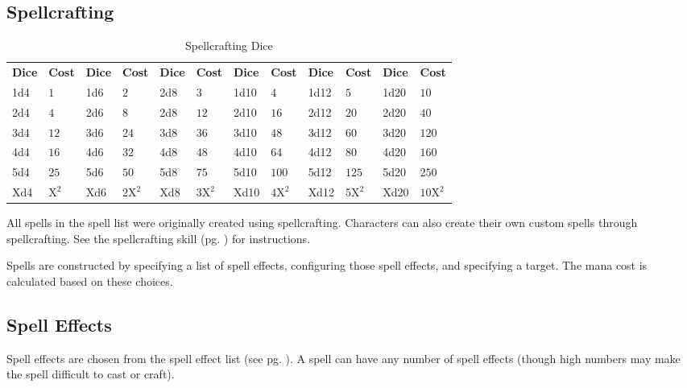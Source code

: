
\begin{multicols*}{2}
    \section{Spellcrafting}
    \begin{table*}[ht]
        \unclassedrowcolors
        \begin{tabularx}{\textwidth}{X X X X X X X X X X X X}
            \textbf{Dice} & \textbf{Cost} & \textbf{Dice} & \textbf{Cost} & \textbf{Dice} & \textbf{Cost} & \textbf{Dice} & \textbf{Cost} & \textbf{Dice} & \textbf{Cost} & \textbf{Dice} & \textbf{Cost} \\
            1d4 & $1$   & 1d6 & $2$    & 2d8 & $3$    & 1d10 & $4$    & 1d12 & $5$    & 1d20 & $10$    \\
            2d4 & $4$   & 2d6 & $8$    & 2d8 & $12$   & 2d10 & $16$   & 2d12 & $20$   & 2d20 & $40$    \\
            3d4 & $12$  & 3d6 & $24$   & 3d8 & $36$   & 3d10 & $48$   & 3d12 & $60$   & 3d20 & $120$   \\
            4d4 & $16$  & 4d6 & $32$   & 4d8 & $48$   & 4d10 & $64$   & 4d12 & $80$   & 4d20 & $160$   \\
            5d4 & $25$  & 5d6 & $50$   & 5d8 & $75$   & 5d10 & $100$  & 5d12 & $125$  & 5d20 & $250$   \\
            Xd4 & $\text{X}^2$ & Xd6 & $\text{2X}^2$ & Xd8 & $\text{3X}^2$ & Xd10 & $\text{4X}^2$ & Xd12 & $\text{5X}^2$ & Xd20 & $\text{10X}^2$ \\
        \end{tabularx}
        \caption{Spellcrafting Dice}
        \label{tab:spellcrafting-dice}
    \end{table*}

    All spells in the spell list were originally created using spellcrafting.
    Characters can also create their own custom spells through spellcrafting.
    See the spellcrafting skill (pg. \pageref{skill:spellcrafting}) for
    instructions.

    Spells are constructed by specifying a list of spell effects, configuring
    those spell effects, and specifying a target. The mana cost is calculated
    based on these choices.

    \subsection{Spell Effects}
    Spell effects are chosen from the spell effect list (see pg.
    \pageref{spell-effect-list}). A spell can have any number of spell effects
    (though high numbers may make the spell difficult to cast or craft).


\end{multicols*}
